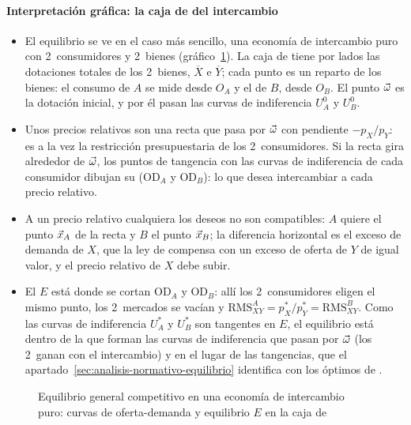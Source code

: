 \documentclass[11pt]{article}
\begin{document}
\paragraph{Interpretación gráfica: la caja de  del intercambio}

\begin{itemize}
\item El equilibrio se ve en el caso más sencillo, una economía de intercambio puro con 2~consumidores y 2~bienes (gráfico~\ref{fig:caja-intercambio-equilibrio}). La caja de  tiene por lados las dotaciones totales de los 2~bienes, $\overline{X}$ e $\overline{Y}$; cada punto es un reparto de los bienes: el consumo de $A$ se mide desde $O_A$ y el de $B$, desde $O_B$. El punto $\vec{\omega}$ es la dotación inicial, y por él pasan las curvas de indiferencia $U_A^0$ y $U_B^0$.
\item Unos precios relativos son una recta que pasa por $\vec{\omega}$ con pendiente $-p_X/p_Y$: es a la vez la restricción presupuestaria de los 2~consumidores. Si la recta gira alrededor de $\vec{\omega}$, los puntos de tangencia con las curvas de indiferencia de cada consumidor dibujan su  ($\mathrm{OD}_A$ y $\mathrm{OD}_B$): lo que desea intercambiar a cada precio relativo.
\item A un precio relativo cualquiera los deseos no son compatibles: $A$ quiere el punto $\vec{x}_A$ de la recta y $B$ el punto $\vec{x}_B$; la diferencia horizontal es el exceso de demanda de $X$, que la ley de  compensa con un exceso de oferta de $Y$ de igual valor, y el precio relativo de $X$ debe subir.
\item El  $E$ está donde se cortan $\mathrm{OD}_A$ y $\mathrm{OD}_B$: allí los 2~consumidores eligen el mismo punto, los 2~mercados se vacían y $\mathrm{RMS}^A_{XY}=p^*_X/p^*_Y=\mathrm{RMS}^B_{XY}$. Como las curvas de indiferencia $U_A^*$ y $U_B^*$ son tangentes en $E$, el equilibrio está dentro de la  que forman las curvas de indiferencia que pasan por $\vec{\omega}$ (los 2~ganan con el intercambio) y en el lugar de las tangencias, que el apartado~\ref{sec:analisis-normativo-equilibrio} identifica con los óptimos de .
\end{itemize}

\begin{figure}[H]
\centering
\caption{Equilibrio general competitivo en una economía de intercambio puro: curvas de oferta-demanda y equilibrio $E$ en la caja de }\label{fig:caja-intercambio-equilibrio}
\end{figure}
\end{document}
